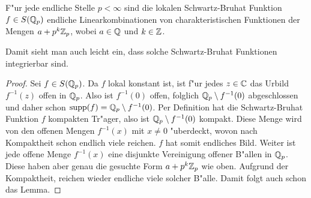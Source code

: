 		\begin{lemma}\label{lemma:padischSBF}
			F"ur jede endliche Stelle $p<\infty$ sind die lokalen Schwartz-Bruhat Funktion $f\in S({\mathbb{Q}_p})$ endliche Linearkombinationen von charakteristischen Funktionen der Mengen ${a+p^k{\mathbb{Z}_p}}$, wobei $a\in \mathbb{Q}$ und $k\in \mathbb{Z}$.
		\end{lemma}
		Damit sieht man auch leicht ein, dass solche Schwartz-Bruhat Funktionen integrierbar sind.
		\begin{proof}
			Sei $f \in S({\mathbb{Q}_p})$. 
			Da $f$ lokal konstant ist, ist f"ur jedes $z\in\mathbb{C}$ das Urbild $f^{-1}(z)$ offen in ${\mathbb{Q}_p}$. 
			Also ist $f^{-1}(0)$ offen, folglich ${\mathbb{Q}_p} \setminus f^{-1}(0)$ abgeschlossen und daher schon $\text{supp}(f) = {\mathbb{Q}_p} \setminus f^{-1}(0)$. 
			Per Definition hat die Schwartz-Bruhat Funktion $f$ kompakten Tr"ager, also ist ${\mathbb{Q}_p} \setminus f^{-1}(0)$ kompakt. 
			Diese Menge wird von den offenen Mengen $f^{-1} (x)$ mit $x\not= 0$ "uberdeckt, wovon nach Kompaktheit schon endlich viele reichen.
			$f$ hat somit endliches Bild. Weiter ist jede offene Menge $f^{-1} (x)$ eine disjunkte Vereinigung offener B"allen in ${\mathbb{Q}_p}$. 
			Diese haben aber genau die gesuchte Form $a+p^k{\mathbb{Z}_p}$ wie oben. 
			Aufgrund der Kompaktheit, reichen wieder endliche viele solcher B"alle. Damit folgt auch schon das Lemma.
		\end{proof}
		
